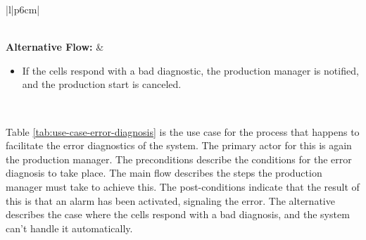 \begin{table}[ht]
\begin{tabular}{|l|p{6cm}|}
\begin{minipage}[t]{\linewidth}
\begin{itemize}
\end{itemize}
\end{minipage}
\\
\hline
\textbf{Alternative Flow:} & 
\begin{minipage}[t]{\linewidth}
\begin{itemize}
  \item If the cells respond with a bad diagnostic, the production manager is notified, and the production start is canceled.
\end{itemize}
\end{minipage} \\
\hline
\end{tabular}
\caption{Use Case Specification for Starting Production}
\label{tab:use-case-start-production}
\end{table}

Table \ref{tab:use-case-error-diagnosis} is the use case for the process that happens to facilitate the error diagnostics of the system. The primary actor for this is again the production manager. The preconditions describe the conditions for the error diagnosis to take place. The main flow describes the steps the production manager must take to achieve this. The post-conditions indicate that the result of this is that an alarm has been activated, signaling the error. The alternative describes the case where the cells respond with a bad diagnosis, and the system can't handle it automatically.

